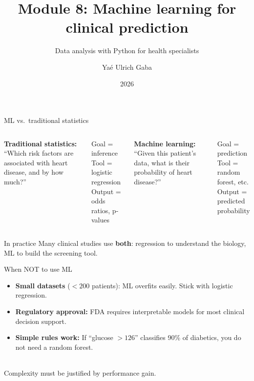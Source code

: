 \documentclass[aspectratio=169,11pt]{beamer}
\title{Module 8: Machine learning for clinical prediction}
\subtitle{Data analysis with Python for health specialists}
\author{Yaé Ulrich Gaba}
\institute{AIRINA Labs}
\date{2026}
\begin{document}
\maketitle

\begin{frame}{ML vs.\ traditional statistics}
\begin{columns}
\textbf{Traditional statistics:}\\
``Which risk factors are associated with heart disease, and by how much?''

\vspace{4pt}
Goal = \alert{inference}\\
Tool = logistic regression\\
Output = odds ratios, p-values

\textbf{Machine learning:}\\
``Given this patient's data, what is their probability of heart disease?''

\vspace{4pt}
Goal = \alert{prediction}\\
Tool = random forest, etc.\\
Output = predicted probability
\end{columns}

\vspace{8pt}
\begin{exampleblock}{In practice}
Many clinical studies use \textbf{both}: regression to understand the biology, ML to build the screening tool.
\end{exampleblock}
\end{frame}

\begin{frame}{When NOT to use ML}
\begin{itemize}
  \item \textbf{Small datasets} ($< 200$ patients): ML overfits easily. Stick with logistic regression.
  \item \textbf{Regulatory approval:} FDA requires interpretable models for most clinical decision support.
  \item \textbf{Simple rules work:} If ``glucose $> 126$'' classifies 90\% of diabetics, you do not need a random forest.
\end{itemize}

\vspace{8pt}
\centering
\Large
{}\\[4pt]
{\normalsize Complexity must be \alert{justified by performance gain}.}
\end{frame}
\end{document}
